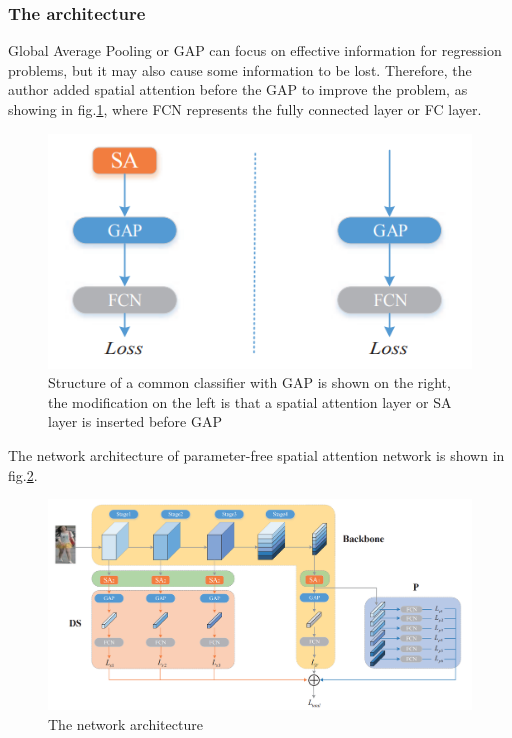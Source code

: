 \subsubsection{The architecture}
\hspace{0.45cm} Global Average Pooling \cite{netinnet} or \acrshort{GAP} can focus on effective 
information for regression problems, 
but it may also cause some information to be lost\cite{SA}. 
Therefore, the author added spatial attention before the \acrshort{GAP} to improve the problem, 
as showing in fig.\ref{fig:sa_gap}\cite{SA}, where FCN represents the fully connected layer or \acrshort{FC} layer.\par
 \begin{figure}[h!]
     \centering
     \includegraphics[scale=0.6]{Chapters/Fig/attention-sa-gap.PNG}
     \caption{Structure of a common classifier with \acrshort{GAP} is shown on the right, the modification on the left is that a spatial attention layer or \acrshort{SA} layer is inserted before \acrshort{GAP}}
     \label{fig:sa_gap}
 \end{figure}
The network architecture of parameter-free spatial attention network is shown in fig.\ref{fig:sa_arc}\cite{SA}.\par
\begin{figure}[h!]
    \centering
    \includegraphics[width=\textwidth]{Chapters/Fig/attention_network.PNG}
    \caption{The network architecture}
    \label{fig:sa_arc}
\end{figure}
